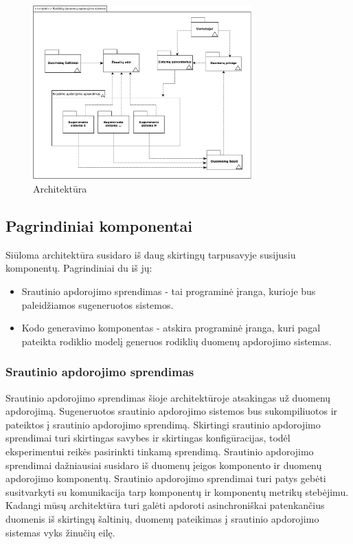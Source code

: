 \documentclass{VUMIFPSbakalaurinis}
\begin{document}
\begin{figure}[H]
    \centering
    \includegraphics[width=0.75\textwidth]{img/architekturos_diagrama.pdf}
    \caption{Architektūra}
    \label{img:architektura}
\end{figure}

\subsection{Pagrindiniai komponentai}
Siūloma architektūra susidaro iš daug skirtingų tarpusavyje susijusiu komponentų. Pagrindiniai du iš jų:
\begin{itemize}
    \item Srautinio apdorojimo sprendimas - tai programinė įranga, kurioje bus paleidžiamos sugeneruotos sistemos.
    \item Kodo generavimo komponentas - atskira programinė įranga, kuri pagal pateikta rodiklio modelį generuos rodiklių duomenų apdorojimo sistemas. 
\end{itemize}

\subsubsection{Srautinio apdorojimo sprendimas}

Srautinio apdorojimo sprendimas šioje architektūroje atsakingas už duomenų apdorojimą. Sugeneruotos srautinio apdorojimo sistemos bus sukompiliuotos ir pateiktos į srautinio apdorojimo sprendimą. Skirtingi srautinio apdorojimo sprendimai turi skirtingas savybes ir skirtingas konfigūracijas, todėl eksperimentui reikės pasirinkti tinkamą sprendimą. Srautinio apdorojimo sprendimai dažniausiai susidaro iš duomenų įeigos komponento ir duomenų apdorojimo komponentų. Srautinio apdorojimo sprendimai turi patys gebėti susitvarkyti su komunikacija tarp komponentų ir komponentų metrikų stebėjimu. Kadangi mūsų architektūra turi galėti apdoroti asinchroniškai patenkančius duomenis iš skirtingų šaltinių, duomenų pateikimas į srautinio apdorojimo sistemas vyks žinučių eilę. 
\end{document}

